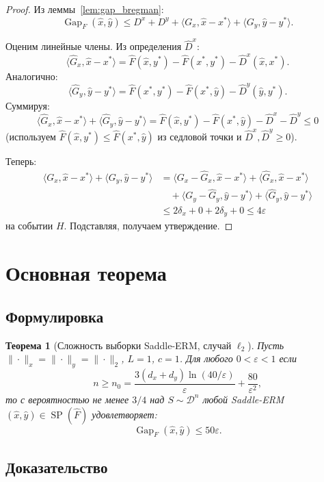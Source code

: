 \documentclass[12pt,a4paper]{article}
\theoremstyle{plain}
\newtheorem{theorem}{Теорема}[section]
\theoremstyle{definition}
\DeclareMathOperator{\Gap}{Gap}
\DeclareMathOperator{\SP}{SP}
\newcommand{\cD}{\mathcal{D}}
\newcommand{\hatF}{\hat{F}}
\newcommand{\hatD}{\hat{D}}
\newcommand{\hatG}{\hat{G}}
\begin{document}
\begin{proof}
Из леммы~\ref{lem:gap_bregman}:
\[
    \Gap_F(\hat{x},\hat{y})\le D^x+D^y+\langle G_x,\hat{x}-x^*\rangle+\langle G_y,\hat{y}-y^*\rangle.
\]

Оценим линейные члены. Из определения $\hatD^x$:
\[
    \langle\hatG_x,\hat{x}-x^*\rangle=\hatF(\hat{x},y^*)-\hatF(x^*,y^*)-\hatD^x(\hat{x},x^*).
\]
Аналогично:
\[
    \langle\hatG_y,\hat{y}-y^*\rangle=\hatF(x^*,y^*)-\hatF(x^*,\hat{y})-\hatD^y(\hat{y},y^*).
\]
Суммируя:
\[
    \langle\hatG_x,\hat{x}-x^*\rangle+\langle\hatG_y,\hat{y}-y^*\rangle=\hatF(\hat{x},y^*)-\hatF(x^*,\hat{y})-\hatD^x-\hatD^y\le 0
\]
(используем $\hatF(\hat{x},y^*)\le\hatF(x^*,\hat{y})$ из седловой точки и $\hatD^x,\hatD^y\ge 0$).

Теперь:
\begin{align*}
    \langle G_x,\hat{x}-x^*\rangle+\langle G_y,\hat{y}-y^*\rangle
    &=\langle G_x-\hatG_x,\hat{x}-x^*\rangle+\langle\hatG_x,\hat{x}-x^*\rangle\\
    &\quad+\langle G_y-\hatG_y,\hat{y}-y^*\rangle+\langle\hatG_y,\hat{y}-y^*\rangle\\
    &\le 2\delta_x+0+2\delta_y+0\le 4\varepsilon
\end{align*}
на событии $H$. Подставляя, получаем утверждение.
\end{proof}

\section{Основная теорема}

\subsection{Формулировка}

\begin{theorem}[Сложность выборки Saddle-ERM, случай $\ell_2$]
\label{thm:main}
Пусть $\|\cdot\|_x=\|\cdot\|_y=\|\cdot\|_2$, $L=1$, $c=1$. Для любого $0<\varepsilon<1$ если
\[
    n\ge n_0=\frac{3(d_x+d_y)\ln(40/\varepsilon)}{\varepsilon}+\frac{80}{\varepsilon^2},
\]
то с вероятностью не менее $3/4$ над $S\sim\cD^n$ любой Saddle-ERM $(\hat{x},\hat{y})\in\SP(\hatF)$ удовлетворяет:
\[
    \Gap_F(\hat{x},\hat{y})\le 50\varepsilon.
\]
\end{theorem}

\subsection{Доказательство}
\end{document}
